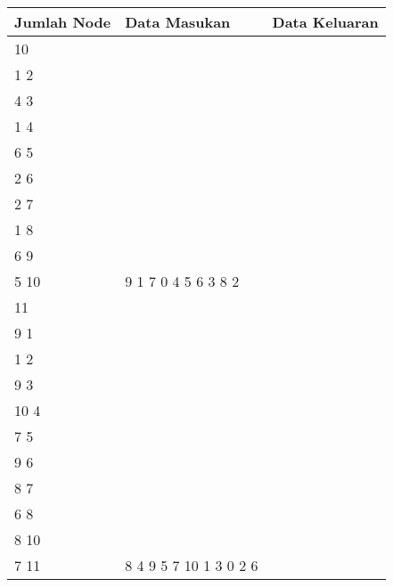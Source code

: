 	\pagebreak
	\begin{longtable}[Ht]{| p{} | p{} | p{} |}
		\hline
		Jumlah Node & Data Masukan                                                                                                                                                                                                                          & Data Keluaran                                                          \\ \hline
	10          & \begin{tabular}[c]{@{}l@{}}10\\ 1 2\\ 4 3\\ 1 4\\ 6 5\\ 2 6\\ 2 7\\ 1 8\\ 6 9\\ 5 10\end{tabular}                                                                                                                                     & 9 1 7 0 4 5 6 3 8 2                                                    \\ \hline
	11          & \begin{tabular}[c]{@{}l@{}}11\\ 9 1\\ 1 2\\ 9 3\\ 10 4\\ 7 5\\ 9 6\\ 8 7\\ 6 8\\ 8 10\\ 7 11\end{tabular}                                                                                                                             & 8 4 9 5 7 10 1 3 0 2 6                                                 \\ \hline
	\end{longtable}
	\pagebreak
